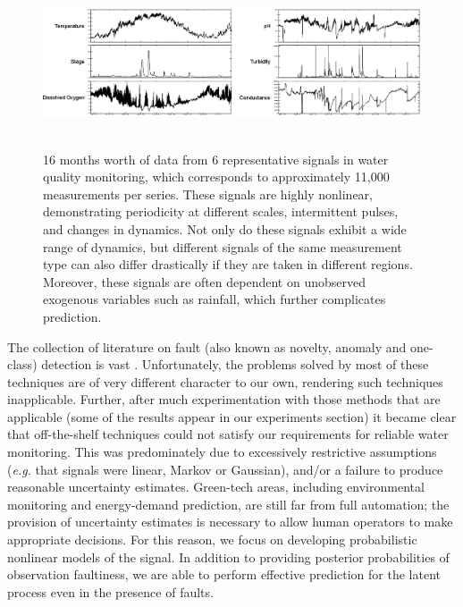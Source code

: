 \documentclass{article} %
\begin{document}
\begin{figure}[t!]
\begin{center}
 \includegraphics[width=\textwidth, height=5cm]{watermonitoring.eps}
\end{center}
\caption{16 months worth of data from 6 representative
signals in water quality monitoring,
which corresponds to approximately 11,000 measurements per series.
These signals are highly nonlinear, demonstrating periodicity at
different scales,
intermittent pulses, and changes in dynamics. Not only do these
signals exhibit a wide range of dynamics,
but different signals of the same measurement type can also differ
drastically if they are taken in different regions.
Moreover, these signals are often dependent on unobserved exogenous
variables such as rainfall, which further complicates
prediction.}
\label{fig:monitoring}
\end{figure}


The collection of literature on fault (also known as novelty, anomaly
and one-class) detection is vast
\cite{Eciolaza2001, deFreitas1996,
 Isermann2005, Ding2008,Markou2003,Chandola:2009,Khan2010,Dereszynski}.
Unfortunately, the problems solved by most of these techniques are of
very different character to our own, rendering such techniques
inapplicable. Further, after
much experimentation with those methods that are applicable (some of the results
appear in our experiments section) it became clear that off-the-shelf
techniques could not satisfy our requirements for reliable water
monitoring. This was predominately due to excessively restrictive assumptions
(\emph{e.g.} that signals were linear, Markov or Gaussian), and/or a failure to
produce reasonable uncertainty
estimates. Green-tech areas, including environmental monitoring and
energy-demand prediction, are still far from full
automation; the provision of uncertainty estimates is necessary to
allow human operators to make appropriate decisions. For this reason,
we focus on developing probabilistic nonlinear models of the signal. In
addition to
providing posterior probabilities of observation faultiness, we are
able to perform effective prediction for the latent process even in
the presence of faults.
\end{document}
